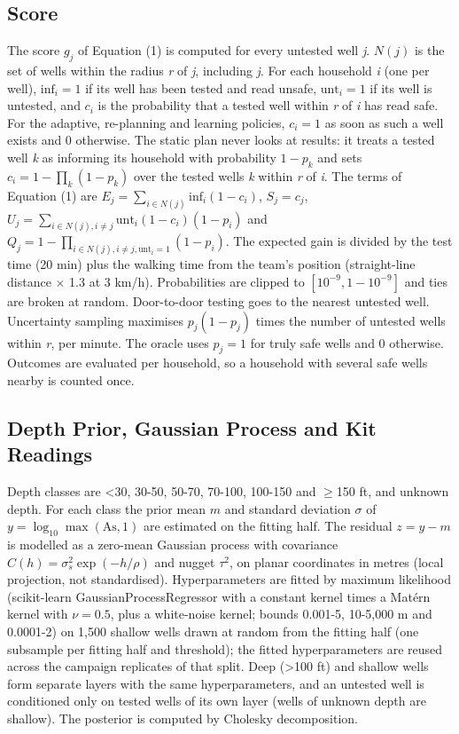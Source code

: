 \documentclass[sustainability,article,submit,pdftex,moreauthors]{Definitions/mdpi}
\begin{document}
\subsection{Score}

The score $g_j$ of Equation (1) is computed for every untested well \textit{j}. $N(j)$ is the set of wells within the radius \textit{r} of \textit{j}, including \textit{j}. For each household \textit{i} (one per well), $\mathrm{inf}_i = 1$ if its well has been tested and read unsafe, $\mathrm{unt}_i = 1$ if its well is untested, and $c_i$ is the probability that a tested well within \textit{r} of \textit{i} has read safe. For the adaptive, re-planning and learning policies, $c_i = 1$ as soon as such a well exists and 0 otherwise. The static plan never looks at results: it treats a tested well \textit{k} as informing its household with probability $1 - p_k$ and sets $c_i = 1 - \prod_k (1 - p_k)$ over the tested wells \textit{k} within \textit{r} of \textit{i}. The terms of Equation (1) are $E_j = \sum_{i \in N(j)} \mathrm{inf}_i (1 - c_i)$, $S_j = c_j$, $U_j = \sum_{i \in N(j), i \neq j} \mathrm{unt}_i (1 - c_i)(1 - p_i)$ and $Q_j = 1 - \prod_{i \in N(j), i \neq j, \mathrm{unt}_i = 1} (1 - p_i)$. The expected gain is divided by the test time (20 min) plus the walking time from the team's position (straight-line distance $\times$ 1.3 at 3 km/h). Probabilities are clipped to $[10^{-9}, 1 - 10^{-9}]$ and ties are broken at random. Door-to-door testing goes to the nearest untested well. Uncertainty sampling maximises $p_j (1 - p_j)$ times the number of untested wells within \textit{r}, per minute. The oracle uses $p_j = 1$ for truly safe wells and 0 otherwise. Outcomes are evaluated per household, so a household with several safe wells nearby is counted once.

\subsection{Depth Prior, Gaussian Process and Kit Readings}

Depth classes are <30, 30-50, 50-70, 70-100, 100-150 and $\geq$150 ft, and unknown depth. For each class the prior mean $m$ and standard deviation $\sigma$ of $y = \log_{10} \max(\mathrm{As}, 1)$ are estimated on the fitting half. The residual $z = y - m$ is modelled as a zero-mean Gaussian process with covariance $C(h) = \sigma_s^2 \exp(-h/\rho)$ and nugget $\tau^2$, on planar coordinates in metres (local projection, not standardised). Hyperparameters are fitted by maximum likelihood (scikit-learn GaussianProcessRegressor with a constant kernel times a Mat\'{e}rn kernel with $\nu = 0.5$, plus a white-noise kernel; bounds 0.001-5, 10-5,000 m and 0.0001-2) on 1,500 shallow wells drawn at random from the fitting half (one subsample per fitting half and threshold); the fitted hyperparameters are reused across the campaign replicates of that split. Deep (>100 ft) and shallow wells form separate layers with the same hyperparameters, and an untested well is conditioned only on tested wells of its own layer (wells of unknown depth are shallow). The posterior is computed by Cholesky decomposition.
\end{document}
